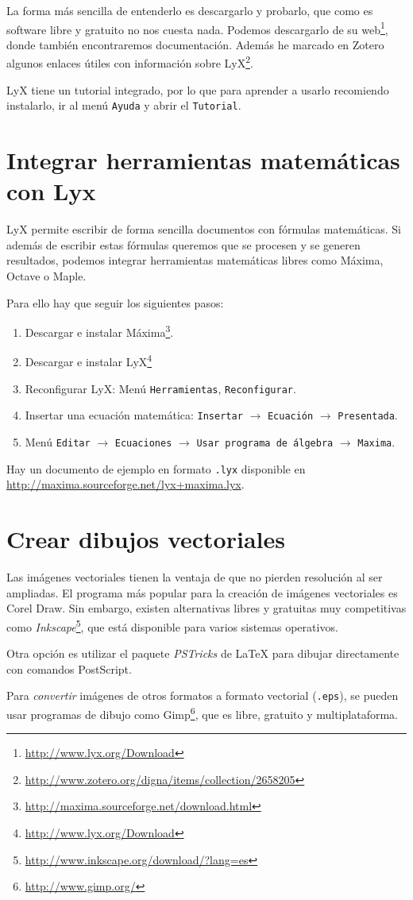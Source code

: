 \documentclass[12pt,a4paper, oneside]{report}
\begin{document}
La forma más sencilla de entenderlo es descargarlo y probarlo, que como es software libre y gratuito no nos cuesta nada. Podemos descargarlo de su web\footnote{\url{http://www.lyx.org/Download}}, donde también encontraremos documentación. Además he marcado en Zotero algunos enlaces útiles con información sobre LyX\footnote{\url{http://www.zotero.org/digna/items/collection/2658205}}.

LyX tiene un tutorial integrado, por lo que para aprender a usarlo recomiendo instalarlo, ir al menú \texttt{Ayuda} y abrir el \texttt{Tutorial}.

\section{Integrar herramientas matemáticas con Lyx}

LyX permite escribir de forma sencilla documentos con fórmulas matemáticas. Si además de escribir estas fórmulas queremos que se procesen y se generen resultados, podemos integrar herramientas matemáticas libres como Máxima, Octave o Maple.

Para ello hay que seguir los siguientes pasos: 

\begin{enumerate}
	\item Descargar e instalar Máxima\footnote{\url{http://maxima.sourceforge.net/download.html}}.
	\item Descargar e instalar LyX\footnote{\url{http://www.lyx.org/Download}}
	\item Reconfigurar LyX: Menú \texttt{Herramientas}, \texttt{Reconfigurar}.
	\item Insertar una ecuación matemática: \texttt{Insertar} $\rightarrow$ \texttt{Ecuación} $\rightarrow$ \texttt{Presentada}.
	\item Menú \texttt{Editar} $\rightarrow$ \texttt{Ecuaciones} $\rightarrow$ \texttt{Usar programa de álgebra} $\rightarrow$ \texttt{Maxima}.
\end{enumerate}

Hay un documento de ejemplo en formato \texttt{.lyx} disponible en \url{http://maxima.sourceforge.net/lyx+maxima.lyx}.

\section{Crear dibujos vectoriales}

Las imágenes vectoriales tienen la ventaja de que no pierden resolución al ser ampliadas. El programa más popular para la creación de imágenes vectoriales es Corel Draw. Sin embargo, existen alternativas libres y gratuitas muy competitivas como \emph{Inkscape}\footnote{\url{http://www.inkscape.org/download/?lang=es}}, que está disponible para varios sistemas operativos.

Otra opción es utilizar el paquete \emph{PSTricks} de \LaTeX{} para dibujar directamente con comandos PostScript.

Para \emph{convertir} imágenes de otros formatos a formato vectorial (\texttt{.eps}), se pueden usar programas de dibujo como Gimp\footnote{\url{http://www.gimp.org/}}, que es libre, gratuito y multiplataforma. 
\end{document}

